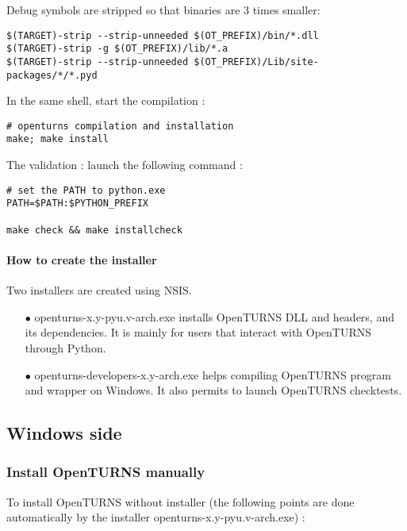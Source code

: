 Debug symbols are stripped so that binaries are 3 times smaller:
\begin{verbatim}
$(TARGET)-strip --strip-unneeded $(OT_PREFIX)/bin/*.dll
$(TARGET)-strip -g $(OT_PREFIX)/lib/*.a
$(TARGET)-strip --strip-unneeded $(OT_PREFIX)/Lib/site-packages/*/*.pyd
\end{verbatim}

In the same shell, start the compilation :
\begin{verbatim}
# openturns compilation and installation
make; make install
\end{verbatim}

The validation : launch the following command :
\begin{verbatim}
# set the PATH to python.exe
PATH=$PATH:$PYTHON_PREFIX

make check && make installcheck
\end{verbatim}

\paragraph{How to create the installer}

Two installers are created using NSIS.
\begin{itemize}
\item[$\bullet$]   openturns-x.y-pyu.v-arch.exe installs OpenTURNS DLL and headers, and its dependencies. It is mainly for users that interact with OpenTURNS through Python.
\item[$\bullet$]   openturns-developers-x.y-arch.exe helps compiling OpenTURNS program and wrapper on Windows. It also permits to launch OpenTURNS checktests.
\end{itemize}

\subsection{Windows side}

\subsubsection{Install OpenTURNS manually}

To install OpenTURNS without installer (the following points are done automatically by the installer openturns-x.y-pyu.v-arch.exe) :

